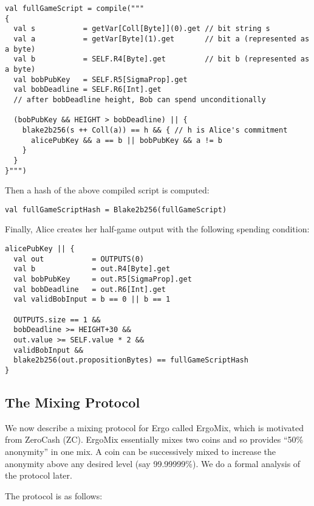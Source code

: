 \documentclass[11pt]{article}
\newcommand{\authnote}[2]{\marginpar{\parbox{\marginparwidth}{\tiny %
  \textsf{#1 {\textcolor{blue}{notes: #2}}}}}%
  \textcolor{blue}{\textbf{\dag}}}
\newcommand{\authnote}[2]{
  \textsf{#1 \textcolor{blue}{: #2}}}
\newcommand{\authnote}[2]{}
\newcommand{\snote}[1]{{\authnote{\textcolor{yellow}{Scalahub notes}}{#1}}}
\newcommand{\mixname}{ErgoMix\xspace}
\begin{document}
\begin{verbatim}
val fullGameScript = compile("""
{
  val s           = getVar[Coll[Byte]](0).get // bit string s 
  val a           = getVar[Byte](1).get       // bit a (represented as a byte)
  val b           = SELF.R4[Byte].get         // bit b (represented as a byte)
  val bobPubKey   = SELF.R5[SigmaProp].get
  val bobDeadline = SELF.R6[Int].get 
  // after bobDeadline height, Bob can spend unconditionally

  (bobPubKey && HEIGHT > bobDeadline) || {
    blake2b256(s ++ Coll(a)) == h && { // h is Alice's commitment
      alicePubKey && a == b || bobPubKey && a != b
    }
  }
}""")
\end{verbatim}

Then a hash of the above compiled script is computed:

\begin{verbatim}
val fullGameScriptHash = Blake2b256(fullGameScript)
\end{verbatim}

Finally, Alice creates her half-game output with the following spending condition:

\begin{verbatim}
alicePubKey || {
  val out           = OUTPUTS(0)
  val b             = out.R4[Byte].get
  val bobPubKey     = out.R5[SigmaProp].get
  val bobDeadline   = out.R6[Int].get
  val validBobInput = b == 0 || b == 1

  OUTPUTS.size == 1 &&
  bobDeadline >= HEIGHT+30 &&
  out.value >= SELF.value * 2 &&
  validBobInput &&
  blake2b256(out.propositionBytes) == fullGameScriptHash
}
\end{verbatim}

\snote{To do: some explanation about above code}

\subsection{The Mixing Protocol}

We now describe a mixing protocol for Ergo called \mixname, which is motivated from ZeroCash (ZC). 
\mixname essentially mixes two coins and so provides ``50\% anonymity'' in one mix. A coin can be successively mixed to increase the anonymity above any desired level (say 99.99999\%). We do a formal analysis of the protocol later. 

The protocol is as follows:
\end{document}
